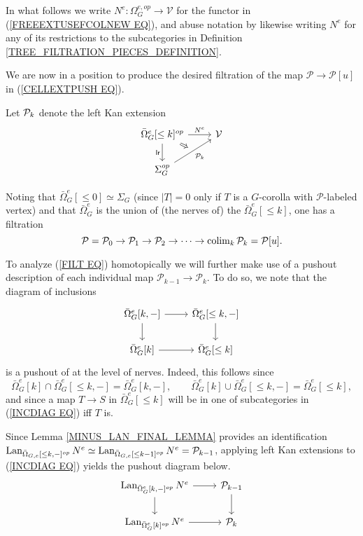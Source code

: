 \documentclass[a4paper,10pt]{article}%
\begin{document}
In what follows we write $N^e \colon \Omega_G^{e,op} \to \mathcal{V}$ for the functor in (\ref{FREEEXTUSEFCOLNEW EQ}),
and abuse notation by likewise writing $N^e$ for any of its restrictions to the subcategories in 
Definition \ref{TREE_FILTRATION_PIECES_DEFINITION}.

We are now in a position to produce the desired filtration of the map $\mathcal{P} \to \mathcal{P}[u]$ in 
(\ref{CELLEXTPUSH EQ}).

\begin{definition}
  \label{PK_DEFN}
  Let $\P_k$ denote the left Kan extension
\[
\begin{tikzcd}
	|[alias=U]| \bar{\Omega}_G^e[\leq k]^{op} \arrow[r, "N^e"] \arrow[d, "\mathsf{lr}"'] & \V
\\
	\Sigma_G^{op} \arrow[ur, "\P_k"', ""{name=V}]
	\arrow[Rightarrow, from=U, to=V]
\end{tikzcd}
\]
\end{definition}
Noting that $\bar{\Omega}_G^e[\leq 0] \simeq \Sigma_G$ (since $|T|=0$ only if $T$ is a $G$-corolla with $\mathcal{P}$-labeled vertex) and that $\bar{\Omega}_G^e$
is the union of (the nerves of) the 
$\bar{\Omega}_G^e[\leq k]$, one has a filtration
\begin{equation}\label{FILT EQ}
	\mathcal{P} = 
	\mathcal{P}_0 \to 
	\mathcal{P}_1 \to
	\mathcal{P}_2 \to
	\cdots \to 
	\colim_k \mathcal{P}_k = \mathcal{P}[u].
\end{equation}


To analyze (\ref{FILT EQ}) homotopically we will further make use of a pushout description of each individual map 
$\mathcal{P}_{k-1} \to \mathcal{P}_k$. To do so, we note that the diagram of inclusions
\begin{equation}\label{INCDIAG EQ}
\begin{tikzcd}
	\bar{\Omega}_G^{e}[k,-] \arrow[d] \arrow[r] &
	\bar{\Omega}_G^{e}[\leq k,-] \arrow[d]
\\
	\bar{\Omega}_G^e[k] \arrow[r] &
	\bar{\Omega}_G^e[\leq k]
\end{tikzcd}
\end{equation}
is a pushout of at the level of nerves.
Indeed, this follows since
\[
\bar{\Omega}_G^e[k] \cap 
\bar{\Omega}_G^{e}[\leq k,-]
= \bar{\Omega}_G^{e}[k,-],
	\qquad
\bar{\Omega}_G^e[k] \cup 
\bar{\Omega}_G^{e}[\leq k,-]
= \bar{\Omega}_G^{e}[\leq k],
\]
and since a map $T \to S$ in 
$\bar{\Omega}_G^e[\leq k]$
will be in one of subcategories in (\ref{INCDIAG EQ}) iff $T$ is.

Since Lemma \ref{MINUS_LAN_FINAL_LEMMA} provides an identification 
$\Lan_{\bar{\Omega}_{G,e}[\leq k,-]^{op}}N^e \simeq
\Lan_{\bar{\Omega}_{G,e}[\leq k-1]^{op}}N^e = \mathcal{P}_{k-1}$,
applying left Kan extensions to (\ref{INCDIAG EQ}) yields the pushout diagram below.
\begin{equation}\label{FILTRATION_LAN_SQUARE_DIAGRAM}
\begin{tikzcd}
	\Lan_{\bar{\Omega}_{G}^e[k,-]^{op}}N^e \arrow[d] \arrow[r] & 
	\P_{k-1} \arrow[d]
\\
	\Lan_{\bar{\Omega}_{G}^e[k]^{op}}N^e \arrow[r] &
	\P_k
\end{tikzcd}
\end{equation}
\end{document}
